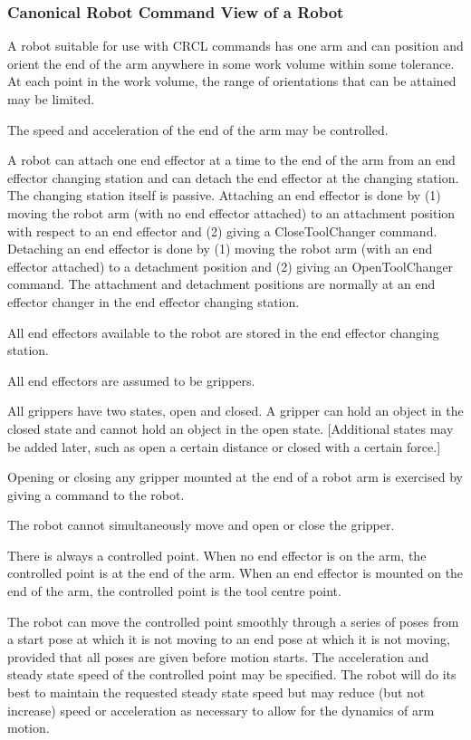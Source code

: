 \subsubsection{Canonical Robot Command View of a Robot}

A robot suitable for use with CRCL commands has one arm and can position
and orient the end of the arm anywhere in some work volume within some
tolerance. At each point in the work volume, the range of orientations that
can be attained may be limited.

The speed and acceleration of the end of the arm may be controlled.

A robot can attach one end effector at a time to the end of the arm from an
end effector changing station and can detach the end effector at the
changing station. The changing station itself is passive.  Attaching an end
effector is done by (1) moving the robot arm (with no end effector
attached) to an attachment position with respect to an end effector and (2)
giving a CloseToolChanger command. Detaching an end effector is done by (1)
moving the robot arm (with an end effector attached) to a detachment
position and (2) giving an OpenToolChanger command. The attachment and
detachment positions are normally at an end effector changer in the end
effector changing station.

All end effectors available to the robot are stored in the end effector
changing station.

All end effectors are assumed to be grippers.

All grippers have two states, open and closed. A gripper can hold an
object in the closed state and cannot hold an object in the open
state. [Additional states may be added later, such as open a certain
distance or closed with a certain force.]

Opening or closing any gripper mounted at the end of a robot arm is
exercised by giving a command to the robot.

The robot cannot simultaneously move and open or close the gripper.

There is always a controlled point. When no end effector is on the arm,
the controlled point is at the end of the arm. When an end effector
is mounted on the end of the arm, the controlled point is the tool
centre point.

The robot can move the controlled point smoothly through a series of
poses from a start pose at which it is not moving to an end pose at
which it is not moving, provided that all poses are given before
motion starts. The acceleration and steady state speed of the
controlled point may be specified. The robot will do its best to
maintain the requested steady state speed but may reduce (but not
increase) speed or acceleration as necessary to allow for the dynamics
of arm motion.


